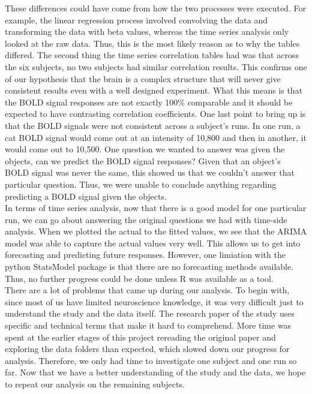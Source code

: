 \documentclass[11pt,twocolumn]{article}
\begin{document}
These differences could have come from how
the two processes were executed. For example, the linear regression process
involved convolving the data and transforming the data with beta values, 
whereas the time series analysis only looked at the raw data. Thus, this is
the most likely reason as to why the tables differed. The second thing the time
series correlation tables had was that across the six subjects, no two subjects
had similar correlation results. This confirms one of our hypothesis that 
the brain is a complex structure that will never give consistent results even
with a well designed experiment. What this means is that the BOLD signal
responses are not exactly 100\% comparable and it should be expected to have
contrasting correlation coefficients. One last point to bring up is that
the BOLD signals were not consistent across a subject's runs. In one run, a
cat BOLD signal would come out at an intensity of 10,800 and then in another,
it would come out to 10,500. One question we wanted to answer was given the
objects, can we predict the BOLD signal responses? Given that an object's
BOLD signal was never the same, this showed us that we couldn't answer that
particular question. Thus, we were unable to conclude anything regarding
predicting a BOLD signal given the objects. \\

In terms of time series analysis, now that there is a good model 
for one particular run, we can go about
answering the original questions we had with time-side analysis. When we 
plotted the actual to the fitted values, we see that the ARIMA model was 
able to capture the actual values very well. This allows us to get into
forecasting and predicting future responses. However, one limiation with
the python StatsModel package is that there are no forecasting methods
available. Thus, no further progress could be done unless R was available
as a tool. \\

There are a lot of problems that came up during our analysis. To begin with, 
since most of us have limited neuroscience knowledge, it was very difficult 
just to understand the study and the data itself. The research paper of the 
study uses specific and technical terms that make it hard to comprehend. 
More time was spent at the earlier stages of this project rereading the 
original paper and exploring the data folders than expected, which slowed down 
our progress for analysis. Therefore, we only had time to investigate one 
subject and one run so far. Now that we have a better understanding of the 
study and the data, we hope to repeat our analysis on the remaining subjects.\\
\end{document}
